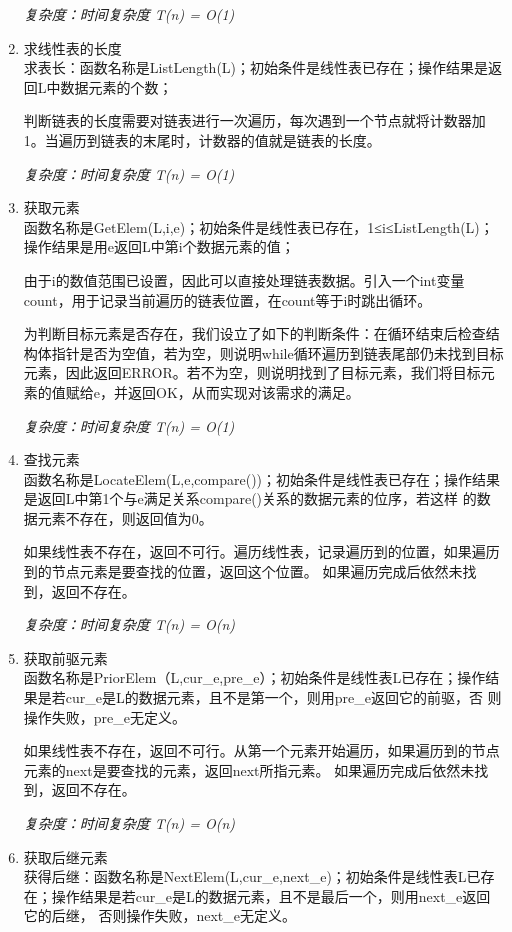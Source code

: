 \documentclass[supercite]{Experimental_Report}
\theoremstyle{definition}
\begin{document}
\begin{enumerate}
	\emph{复杂度：时间复杂度 T(n) = O(1)}
	\item 求线性表的长度\\
	求表长：函数名称是ListLength(L)；初始条件是线性表已存在；操作结果是返回L中数据元素的个数；
	
	判断链表的长度需要对链表进行一次遍历，每次遇到一个节点就将计数器加1。当遍历到链表的末尾时，计数器的值就是链表的长度。
	
	\emph{复杂度：时间复杂度 T(n) = O(1)}
	\item 获取元素\\
函数名称是GetElem(L,i,e)；初始条件是线性表已存在，1≤i≤ListLength(L)；操作结果是用e返回L中第i个数据元素的值；

由于i的数值范围已设置，因此可以直接处理链表数据。引入一个int变量count，用于记录当前遍历的链表位置，在count等于i时跳出循环。

为判断目标元素是否存在，我们设立了如下的判断条件：在循环结束后检查结构体指针是否为空值，若为空，则说明while循环遍历到链表尾部仍未找到目标元素，因此返回ERROR。若不为空，则说明找到了目标元素，我们将目标元素的值赋给e，并返回OK，从而实现对该需求的满足。

\emph{复杂度：时间复杂度 T(n) = O(1)}
	\item 查找元素\\
	函数名称是LocateElem(L,e,compare())；初始条件是线性表已存在；操作结果是返回L中第1个与e满足关系compare()关系的数据元素的位序，若这样
	的数据元素不存在，则返回值为0。
	
	如果线性表不存在，返回不可行。遍历线性表，记录遍历到的位置，如果遍历到的节点元素是要查找的位置，返回这个位置。
	如果遍历完成后依然未找到，返回不存在。
	
	\emph{复杂度：时间复杂度 T(n) = O(n)}
	\item 获取前驱元素\\
	函数名称是PriorElem（L,cur\_e,pre\_e）；初始条件是线性表L已存在；操作结果是若cur\_e是L的数据元素，且不是第一个，则用pre\_e返回它的前驱，否
	则操作失败，pre\_e无定义。
	
	如果线性表不存在，返回不可行。从第一个元素开始遍历，如果遍历到的节点元素的next是要查找的元素，返回next所指元素。
	如果遍历完成后依然未找到，返回不存在。
	
	\emph{复杂度：时间复杂度 T(n) = O(n)}
	\item  获取后继元素\\
	获得后继：函数名称是NextElem(L,cur\_e,next\_e)；初始条件是线性表L已存在；操作结果是若cur\_e是L的数据元素，且不是最后一个，则用next\_e返回它的后继，
	否则操作失败，next\_e无定义。
	

\end{enumerate}
\end{document}
